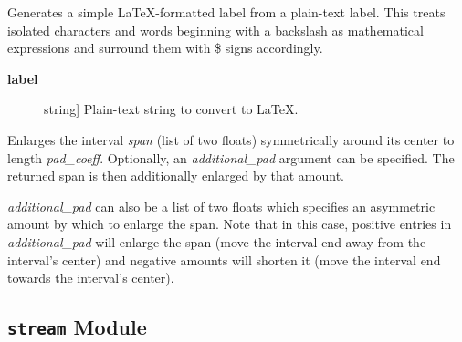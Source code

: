 \documentclass[a4paper,10pt,english]{sphinxmanual}
\begin{document}

\begin{fulllineitems}
\label{index:kafe.plot.label_to_latex}
Generates a simple LaTeX-formatted label from a plain-text label.
This treats isolated characters and words beginning with a backslash
as mathematical expressions and surround them with \$ signs accordingly.
\begin{description}
\item[{\textbf{label}}] \leavevmode{[}string{]}
Plain-text string to convert to LaTeX.

\end{description}

\end{fulllineitems}


\begin{fulllineitems}
\label{index:kafe.plot.pad_span}
Enlarges the interval \emph{span} (list of two floats) symmetrically around
its center to length \emph{pad\_coeff}. Optionally, an \emph{additional\_pad} argument
can be specified. The returned span is then additionally enlarged by that amount.

\emph{additional\_pad} can also be a list of two floats which specifies an asymmetric
amount by which to enlarge the span. Note that in this case, positive entries in
\emph{additional\_pad} will enlarge the span (move the interval end away from the
interval's center) and negative amounts will shorten it (move the interval end
towards the interval's center).

\end{fulllineitems}



\subsection{\texttt{stream} Module}
\label{index:stream-module}\label{index:module-kafe.stream}\label{index:module-stream}
\end{document}
